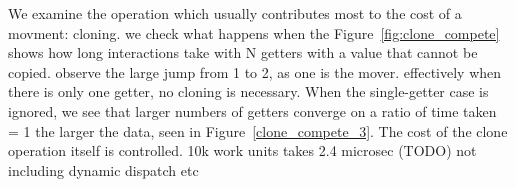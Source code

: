 We examine the operation which usually contributes most to the cost of a movment: cloning. we check what happens when the 
Figure~\ref{fig:clone_compete} shows how long interactions take with N getters with a value that cannot be copied. observe the large jump from 1 to 2, as one is the mover. effectively when there is only one getter, no cloning is necessary. When the single-getter case is ignored, we see that larger numbers of getters converge on a ratio of time taken = 1 the larger the data, seen in Figure~\ref{clone_compete_3}. The cost of the clone operation itself is controlled. 10k work units takes 2.4 microsec (TODO) not including dynamic dispatch etc
\begin{figure}
\centering
{}
\end{figure}
